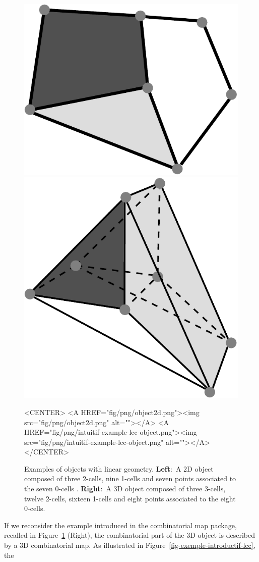 \begin{figure}[ht]
  \begin{ccTexOnly}
    \begin{center}
      \includegraphics[width=.35\textwidth]
      {Linear_cell_complex/fig/pdf/object2d}
      \qquad
      \includegraphics[width=.45\textwidth]
      {Linear_cell_complex/fig/pdf/intuitif-example-lcc-object}
    \end{center}
  \end{ccTexOnly}
  \begin{ccHtmlOnly}
    <CENTER>
    <A HREF="fig/png/object2d.png"><img src="fig/png/object2d.png" alt=""></A>
    <A HREF="fig/png/intuitif-example-lcc-object.png"><img src="fig/png/intuitif-example-lcc-object.png" alt=""></A>
    </CENTER>
    \end{ccHtmlOnly}
    \caption{Examples of objects with linear geometry. \textbf{Left}:~A
      2D object composed of three 2-cells, nine
      1-cells and seven points associated to the seven 0-cells .   
      \textbf{Right}:~A
      3D object composed of three 3-cells, twelve 2-cells, sixteen
      1-cells and eight points associated to the eight 0-cells.
      \label{fig-exemple-introductif}}
\end{figure}
%
If we reconsider the example introduced in the combinatorial map
package, recalled in Figure~\ref{fig-exemple-introductif} (Right), the
combinatorial part of the 3D object is described by a 3D combinatorial
map. As illustrated in Figure~\ref{fig-exemple-introductif-lcc}, the
